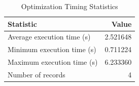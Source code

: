
\begin{table}[h!]
\centering
\begin{tabular}{l r}
\hline
Statistic & Value \\
\hline
Average execution time (s) & 2.521648 \\
Minimum execution time (s) & 0.711224 \\
Maximum execution time (s) & 6.233360 \\
Number of records & 4 \\
\hline
\end{tabular}
\caption{Optimization Timing Statistics}
\end{table}
